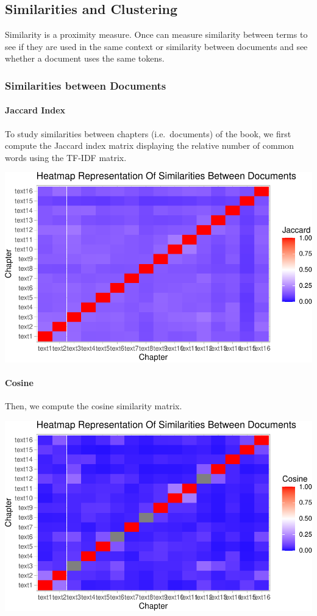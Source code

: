 \documentclass[
]{article}
\begin{document}
\hypertarget{similarities-and-clustering}{%
\subsection{Similarities and
Clustering}\label{similarities-and-clustering}}

Similarity is a proximity measure. Once can measure similarity between
terms to see if they are used in the same context or similarity between
documents and see whether a document uses the same tokens.

\hypertarget{similarities-between-documents}{%
\subsubsection{Similarities between
Documents}\label{similarities-between-documents}}

\hypertarget{jaccard-index}{%
\paragraph{Jaccard Index}\label{jaccard-index}}

To study similarities between chapters (i.e.~documents) of the book, we
first compute the Jaccard index matrix displaying the relative number of
common words using the TF-IDF matrix.

\begin{center}\includegraphics[width=0.7\linewidth]{report_files/figure-latex/Jaccard-1} \end{center}

\hypertarget{cosine}{%
\paragraph{Cosine}\label{cosine}}

Then, we compute the cosine similarity matrix.

\begin{center}\includegraphics[width=0.7\linewidth]{report_files/figure-latex/Cosine-1} \end{center}
\end{document}
